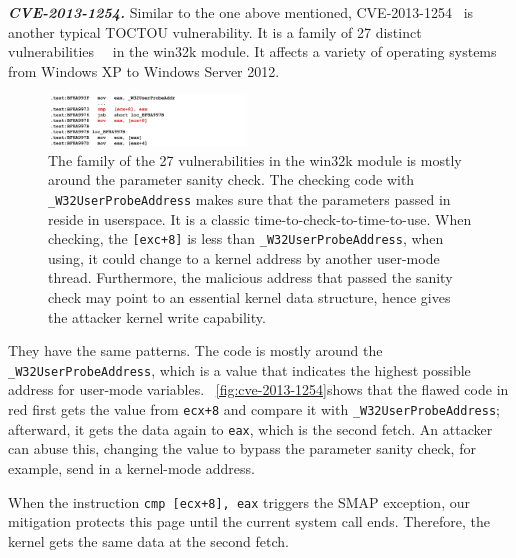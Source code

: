 \textbf{\textit{CVE-2013-1254.}} Similar to the one above mentioned, CVE-2013-1254~\cite{CVE-2013-1254} is another typical TOCTOU vulnerability. It is a family of 27 distinct vulnerabilities~\cite{ms13016}~\cite{jurczyk2013identifying} in the win32k module. It affects a variety of operating systems from Windows XP to Windows Server 2012.


\begin{figure}[th]
  \includegraphics[width=0.47\textwidth]{figures/cve-2013-1254}
  \centering
  \caption{The family of the 27 vulnerabilities in the win32k module is mostly around the parameter sanity check. The checking code with \texttt{\_W32UserProbeAddress} makes sure that the parameters passed in reside in userspace. It is a classic time-to-check-to-time-to-use. When checking, the \texttt{[exc+8]} is less than \texttt{\_W32UserProbeAddress}, when using, it could change to a kernel address by another user-mode thread. Furthermore, the malicious address that passed the sanity check may point to an essential kernel data structure, hence gives the attacker kernel write capability.}
  \label{fig:cve-2013-1254}
\end{figure}


They have the same patterns. The code is mostly around the \texttt{\_W32UserProbeAddress}, which is a value that indicates the highest possible address for user-mode variables. ~\autoref{fig:cve-2013-1254}shows that the flawed code in red first gets the value from \texttt{ecx+8} and compare it with \texttt{\_W32UserProbeAddress}; afterward, it gets the data again to \texttt{eax}, which is the second fetch. An attacker can abuse this, changing the value to bypass the parameter sanity check, for example, send in a kernel-mode address.


When the instruction \texttt{cmp [ecx+8], eax} triggers the SMAP exception, our mitigation protects this page until the current system call ends. Therefore, the kernel gets the same data at the second fetch.

